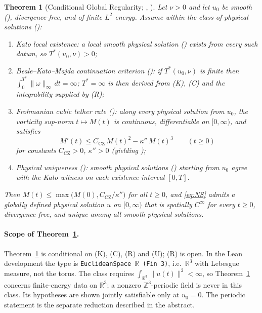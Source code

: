 \documentclass[11pt,a4paper]{article}
\theoremstyle{plain}
\newtheorem{theorem}{Theorem}[section]
\theoremstyle{definition}
\theoremstyle{remark}
\newcommand{\CZ}{C_{\mathrm{CZ}}}
\begin{document}
\begin{theorem}[Conditional Global Regularity; , ]\label{thm:main}
Let $\nu>0$ and let $u_0$ be smooth (), divergence-free, and of finite $L^2$ energy. Assume within the class of physical solutions ():
\begin{enumerate}
\item[(K)] \emph{Kato local existence}: a local smooth physical solution () exists from every such datum, so $T^*(u_0,\nu)>0$;
\item[(C)] \emph{Beale--Kato--Majda continuation criterion} (): if $T^*(u_0,\nu)$ is finite then $\int_0^{T^*}\|\omega\|_\infty\,dt=\infty$; $T^*=\infty$ is then derived from (K), (C) and the integrability supplied by (R);
\item[(R)] \emph{Frohmanian cubic tether rate ()}: along every physical solution from $u_0$, the vorticity sup-norm $t\mapsto M(t)$ is continuous, differentiable on $[0,\infty)$, and satisfies
\[
M'(t)\le \CZ\,M(t)^2-\kappa''\,M(t)^3\qquad(t\ge 0)
\]
for constants $\CZ>0$, $\kappa''>0$ (yielding );
\item[(U)] \emph{Physical uniqueness ()}: smooth physical solutions () starting from $u_0$ agree with the Kato witness on each existence interval $[0,T]$.
\end{enumerate}
Then $M(t)\le\max\bigl(M(0),\CZ/\kappa''\bigr)$ for all $t\ge0$, and \eqref{eq:NS} admits a globally defined physical solution $u$ on $[0,\infty)$ that is spatially $C^\infty$ for every $t\ge0$, divergence-free, and unique among all smooth physical solutions.
\end{theorem}

\paragraph{Scope of Theorem~\ref{thm:main}.} Theorem~\ref{thm:main} is conditional on (K), (C), (R) and (U); (R) is open. In the Lean development the type  is \texttt{EuclideanSpace}~$\mathbb{R}$~\texttt{(Fin 3)}, i.e.\ $\mathbb{R}^3$ with Lebesgue measure, not the torus. The class  requires $\int_{\mathbb{R}^3}\|u(t)\|^2<\infty$, so Theorem~\ref{thm:main} concerns finite-energy data on $\mathbb{R}^3$; a nonzero $\mathbb{Z}^3$-periodic field is never in this class. Its hypotheses are shown jointly satisfiable only at $u_0=0$. The periodic statement is the separate reduction  described in the abstract.
\end{document}
